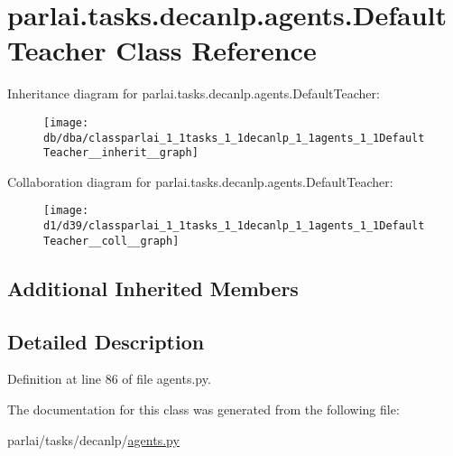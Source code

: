 \hypertarget{classparlai_1_1tasks_1_1decanlp_1_1agents_1_1DefaultTeacher}{}\section{parlai.\+tasks.\+decanlp.\+agents.\+Default\+Teacher Class Reference}
\label{classparlai_1_1tasks_1_1decanlp_1_1agents_1_1DefaultTeacher}


Inheritance diagram for parlai.\+tasks.\+decanlp.\+agents.\+Default\+Teacher\+:\nopagebreak
\begin{figure}[H]
\begin{center}
\leavevmode
\texttt{[image: db/dba/classparlai\_1\_1tasks\_1\_1decanlp\_1\_1agents\_1\_1DefaultTeacher\_\_inherit\_\_graph]}
\end{center}
\end{figure}


Collaboration diagram for parlai.\+tasks.\+decanlp.\+agents.\+Default\+Teacher\+:\nopagebreak
\begin{figure}[H]
\begin{center}
\leavevmode
\texttt{[image: d1/d39/classparlai\_1\_1tasks\_1\_1decanlp\_1\_1agents\_1\_1DefaultTeacher\_\_coll\_\_graph]}
\end{center}
\end{figure}
\subsection*{Additional Inherited Members}


\subsection{Detailed Description}


Definition at line 86 of file agents.\+py.



The documentation for this class was generated from the following file\+:\begin{DoxyCompactItemize}
\item 
parlai/tasks/decanlp/\hyperlink{parlai_2tasks_2decanlp_2agents_8py}{agents.\+py}\end{DoxyCompactItemize}
